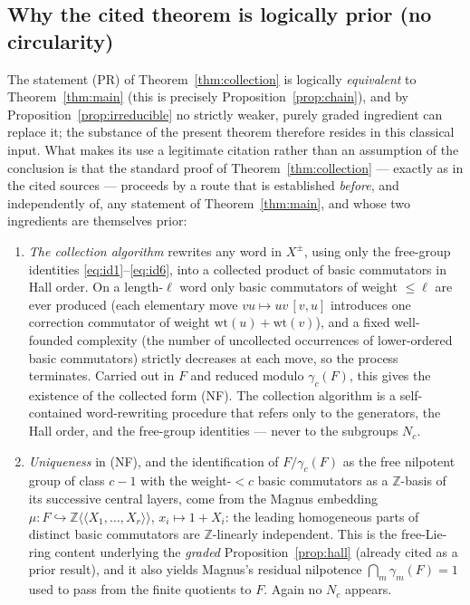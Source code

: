 \documentclass{amsart}
\theoremstyle{definition}
\theoremstyle{remark}
\begin{document}
\subsection*{Why the cited theorem is logically prior (no circularity)}

The statement (PR) of Theorem~\ref{thm:collection} is logically \emph{equivalent} to
Theorem~\ref{thm:main} (this is precisely Proposition~\ref{prop:chain}), and by
Proposition~\ref{prop:irreducible} no strictly weaker, purely graded ingredient can replace
it; the substance of the present theorem therefore resides in this classical input. What makes
its use a legitimate citation rather than an assumption of the conclusion is that the standard
proof of Theorem~\ref{thm:collection} --- exactly as in the cited sources --- proceeds by a
route that is established \emph{before}, and independently of, any statement of
Theorem~\ref{thm:main}, and whose two ingredients are themselves prior:
\begin{enumerate}
\item[(i)] \emph{The collection algorithm} rewrites any word in $X^{\pm}$, using only the
free-group identities \eqref{eq:id1}--\eqref{eq:id6}, into a collected product of basic
commutators in Hall order. On a length-$\ell$ word only basic commutators of weight $\le\ell$
are ever produced (each elementary move $vu\mapsto uv\,[v,u]$ introduces one correction
commutator of weight $\mathrm{wt}(u)+\mathrm{wt}(v)$), and a fixed well-founded complexity (the
number of uncollected occurrences of lower-ordered basic commutators) strictly decreases at each
move, so the process terminates. Carried out in $F$ and reduced modulo $\gamma_c(F)$, this gives
the existence of the collected form (NF). The collection algorithm is a self-contained
word-rewriting procedure that refers only to the generators, the Hall order, and the free-group
identities --- never to the subgroups $N_c$.
\item[(ii)] \emph{Uniqueness} in (NF), and the identification of $F/\gamma_c(F)$ as the free
nilpotent group of class $c-1$ with the weight-$<c$ basic commutators as a $\mathbb Z$-basis of
its successive central layers, come from the Magnus embedding
$\mu\colon F\hookrightarrow\mathbb Z\langle\!\langle X_1,\dots,X_r\rangle\!\rangle$,
$x_i\mapsto 1+X_i$: the leading homogeneous parts of distinct basic commutators are
$\mathbb Z$-linearly independent. This is the free-Lie-ring content underlying the \emph{graded}
Proposition~\ref{prop:hall} (already cited as a prior result), and it also yields Magnus's
residual nilpotence $\bigcap_m\gamma_m(F)=1$ used to pass from the finite quotients to $F$.
Again no $N_c$ appears.
\end{enumerate}
\end{document}
